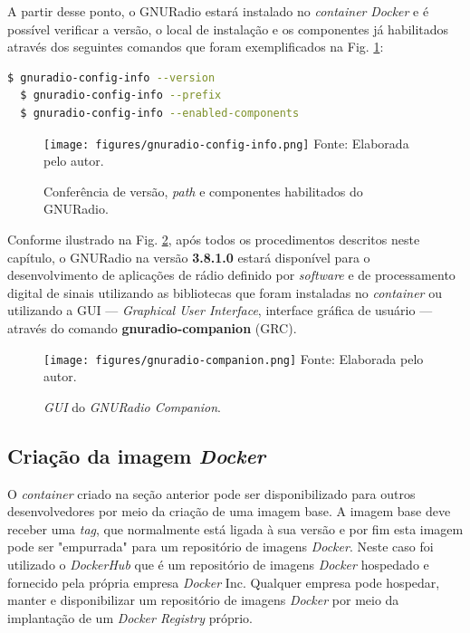 \documentclass[
  12pt,				%
  openright,			%
  twoside,			%
  a4paper,			%
  english,			%
  french,				%
  spanish,			%
  brazil,				%
  ]{abntex2}
\begin{document}
A partir desse ponto, o GNURadio estará instalado no \textit{container} \textit{Docker} e é possível verificar a versão, o local de instalação e os
componentes já habilitados através dos seguintes comandos que foram exemplificados na Fig. \ref{fig:gnuradio-config-info}:

\begin{lstlisting}[language=bash]
  $ gnuradio-config-info --version
  $ gnuradio-config-info --prefix
  $ gnuradio-config-info --enabled-components
\end{lstlisting}

\begin{figure}[!htb]
  \centering
  \caption{Conferência de versão, \textit{path} e componentes habilitados do GNURadio.}
  \texttt{[image: figures/gnuradio-config-info.png]}
  Fonte: Elaborada pelo autor.
  \label{fig:gnuradio-config-info}
\end{figure}

Conforme ilustrado na Fig. \ref{fig:gnuradio-companion}, após todos os procedimentos descritos neste capítulo, o GNURadio na versão \textbf{3.8.1.0} estará
disponível para o desenvolvimento de aplicações de rádio definido por \textit{software} e de processamento digital de sinais utilizando as bibliotecas
que foram instaladas no \textit{container} ou utilizando a GUI — \textit{Graphical User Interface}, interface gráfica de usuário —
através do comando \textbf{gnuradio-companion} (GRC).

\begin{figure}[!htb]
  \centering
  \caption{\textit{GUI} do \textit{GNURadio Companion}.}
  \texttt{[image: figures/gnuradio-companion.png]}
  Fonte: Elaborada pelo autor.
  \label{fig:gnuradio-companion}
\end{figure}

\subsection*{Criação da imagem \textit{Docker}}

O \textit{container} criado na seção anterior pode ser disponibilizado para outros desenvolvedores por meio da criação de uma imagem
base. A imagem base deve receber uma \textit{tag}, que normalmente está ligada à sua versão e por fim esta imagem pode ser
"empurrada" para um repositório de imagens \textit{Docker}. Neste caso foi utilizado o \textit{DockerHub} que é um repositório
de imagens \textit{Docker} hospedado e fornecido pela própria empresa \textit{Docker} Inc. Qualquer empresa pode hospedar, manter
e disponibilizar um repositório de imagens \textit{Docker} por meio da implantação de um \textit{Docker Registry} próprio.
\end{document}
